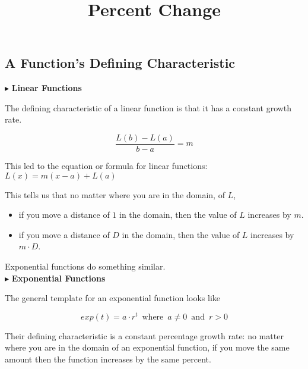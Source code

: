 \documentclass{ximera}
\title{Percent Change}
\begin{document}
\begin{abstract}
\end{abstract}
\maketitle




\subsection*{A Function's Defining Characteristic}




$\blacktriangleright$ \textbf{\textcolor{blue!55!black}{Linear Functions}} 

The defining characteristic of a linear function is that it has a constant growth rate.


\[   \frac{L(b)-L(a)}{b-a} = m       \]

This led to the equation or formula for linear functions:  $L(x) = m(x-a) + L(a)$


This tells us that no matter where you are in the domain, of $L$, 



\begin{itemize}
\item if you move a distance of $1$ in the domain, then the value of $L$ increases by $m$. \\
\item if you move a distance of $D$ in the domain, then the value of $L$ increases by $m \cdot D$. \\
\end{itemize}

Exponential functions do something similar. \\





$\blacktriangleright$ \textbf{\textcolor{blue!55!black}{Exponential Functions}} 



The general template for an exponential function looks like 

\[   exp(t) = a \cdot r^t   \, \text{ where } \,  a \ne 0  \, \text{ and } \,    r > 0   \]



Their defining characteristic is a constant percentage growth rate: no matter where you are in the domain of an exponential function, if you move the same amount then the function increases by the same percent.
\end{document}
